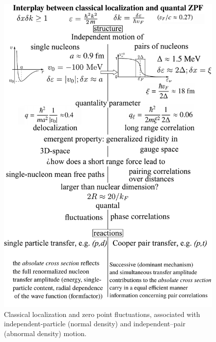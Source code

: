 \begin{figure}
\centerline{\includegraphics*[width=15cm,angle=0]{nutshell/figs/resumevec.pdf}}
\caption{Classical localization and zero point fluctuations, associated with independent-particle (normal density) and independent--pair  (abnormal density) motion.}\label{fig1D2}
\end{figure}





